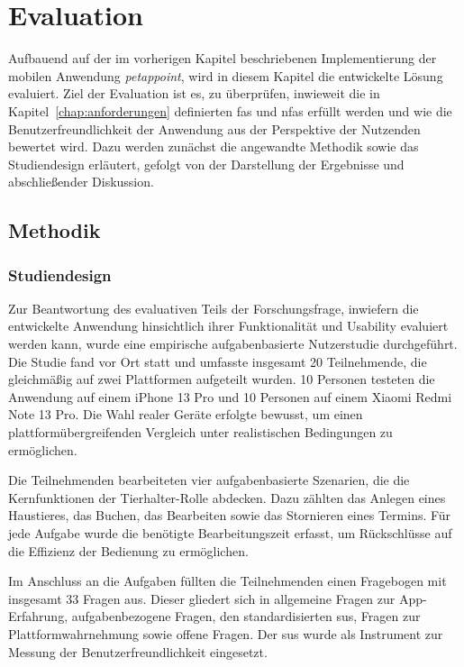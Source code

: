 \chapter{Evaluation}
\label{chap:evaluation}

Aufbauend auf der im vorherigen Kapitel beschriebenen Implementierung der mobilen
Anwendung \textit{petappoint}, wird in diesem Kapitel die entwickelte Lösung evaluiert. Ziel der Evaluation ist es, zu überprüfen, inwieweit die in Kapitel~\ref{chap:anforderungen} definierten \gls{fas} und \gls{nfas} erfüllt werden und wie die
Benutzerfreundlichkeit der Anwendung aus der Perspektive der Nutzenden bewertet wird. Dazu werden zunächst die angewandte Methodik sowie das Studiendesign erläutert, gefolgt von der Darstellung der Ergebnisse und abschließender Diskussion.

\section{Methodik}

\subsection{Studiendesign}

Zur Beantwortung des evaluativen Teils der Forschungsfrage, inwiefern die entwickelte Anwendung hinsichtlich ihrer Funktionalität und Usability evaluiert werden kann, wurde eine empirische aufgabenbasierte Nutzerstudie durchgeführt.
Die Studie fand vor Ort statt und umfasste insgesamt 20 Teilnehmende, die gleichmäßig auf zwei Plattformen aufgeteilt wurden. 10 Personen testeten die Anwendung auf einem iPhone 13 Pro und 10 Personen auf einem Xiaomi Redmi Note 13 Pro. Die Wahl realer Geräte erfolgte bewusst, um einen plattformübergreifenden Vergleich unter realistischen Bedingungen zu ermöglichen.

Die Teilnehmenden bearbeiteten vier aufgabenbasierte Szenarien, die die Kernfunktionen der Tierhalter-Rolle abdecken. Dazu zählten das Anlegen eines Haustieres, das Buchen, das Bearbeiten sowie das Stornieren eines Termins. Für jede Aufgabe wurde die benötigte Bearbeitungszeit erfasst, um Rückschlüsse auf die Effizienz der Bedienung zu ermöglichen.

Im Anschluss an die Aufgaben füllten die Teilnehmenden einen Fragebogen mit insgesamt 33 Fragen aus. Dieser gliedert sich in allgemeine Fragen zur App-Erfahrung, aufgabenbezogene Fragen, den standardisierten \gls{sus}, Fragen zur Plattformwahrnehmung sowie offene Fragen. Der \gls{sus} wurde als Instrument zur Messung der Benutzerfreundlichkeit eingesetzt.

